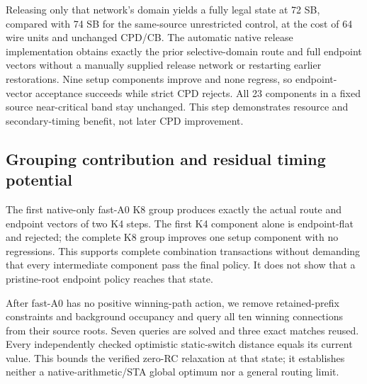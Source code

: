\documentclass[conference,10pt]{IEEEtran}
\begin{document}
Releasing only that network's domain yields a fully legal state at 72 SB, compared with 74 SB for the same-source unrestricted control, at the cost of 64 wire units and unchanged CPD/CB. The automatic native release implementation obtains exactly the prior selective-domain route and full endpoint vectors without a manually supplied release network or restarting earlier restorations. Nine setup components improve and none regress, so endpoint-vector acceptance succeeds while strict CPD rejects. All 23 components in a fixed source near-critical band stay unchanged. This step demonstrates resource and secondary-timing benefit, not later CPD improvement.

\subsection{Grouping contribution and residual timing potential}
The first native-only fast-A0 K8 group produces exactly the actual route and endpoint vectors of two K4 steps. The first K4 component alone is endpoint-flat and rejected; the complete K8 group improves one setup component with no regressions. This supports complete combination transactions without demanding that every intermediate component pass the final policy. It does not show that a pristine-root endpoint policy reaches that state.

After fast-A0 has no positive winning-path action, we remove retained-prefix constraints and background occupancy and query all ten winning connections from their source roots. Seven queries are solved and three exact matches reused. Every independently checked optimistic static-switch distance equals its current value. This bounds the verified zero-RC relaxation at that state; it establishes neither a native-arithmetic/STA global optimum nor a general routing limit.
\end{document}

